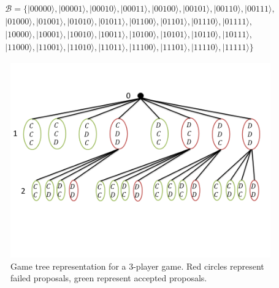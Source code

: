 \begin{equation}
\begin{split}
\mathcal{B}= \{ \vert 00000\rangle , \vert 00001\rangle , \vert 00010\rangle , \vert 00011\rangle , \vert 00100\rangle , \vert 00101\rangle , \vert 00110\rangle , \vert 00111\rangle, \\
 \vert 01000\rangle , \vert 01001\rangle , \vert 01010\rangle , \vert 01011\rangle , \vert 01100\rangle , \vert 01101\rangle , \vert 01110\rangle , \vert 01111\rangle, \\
 \vert 10000\rangle , \vert 10001\rangle , \vert 10010\rangle , \vert 10011\rangle , \vert 10100\rangle , \vert 10101\rangle , \vert 10110\rangle , \vert 10111\rangle, \\
 \vert 11000\rangle , \vert 11001\rangle , \vert 11010\rangle , \vert 11011\rangle , \vert 11100\rangle , \vert 11101\rangle , \vert 11110\rangle , \vert 11111\rangle \}
\end{split}
\label{putadevida}
\end{equation}



\begin{figure}[h]
\centering 
\includegraphics[scale=0.55]{Figures/architecture/GameTree/Slide1.png}
\caption{Game tree representation for a $3$-player game. Red circles represent failed proposals, green represent accepted proposals. }
\label{fig:pg_architecturegametree}
\end{figure}

